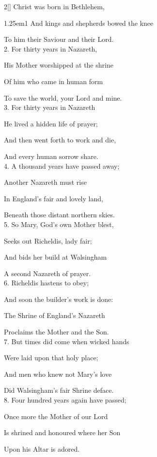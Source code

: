 \begin{paracol}{2}[]
 Christ was born in Bethlehem,\par
{}

\begin{hangparas}{1.25em}{1}
And kings and shepherds bowed the knee\par
To him their Saviour and their Lord.\\

2. For thirty years in Nazareth,\par
His Mother worshipped at the shrine\par
Of him who came in human form\par
To save the world, your Lord and mine.\\

3. For thirty years in Nazareth\par
He lived a hidden life of prayer;\par
And then went forth to work and die,\par
And every human sorrow share.\\

4. A thousand years have passed away;\par
Another Nazareth must rise\par
In England’s fair and lovely land,\par
Beneath those distant northern skies.\\

5. So Mary, God's own Mother blest,\par
Seeks out Richeldis, lady fair;\par
And bids her build at Walsingham\par
A second Nazareth of prayer.\\

6. Richeldis hastens to obey;\par
And soon the builder’s work is done:\par
The Shrine of England’s Nazareth\par
Proclaims the Mother and the Son.\\

7. But times did come when wicked hands\par
Were laid upon that holy place;\par
And men who knew not Mary's love\par
Did Walsingham's fair Shrine deface.\\

8. Four hundred years again have passed;\par
Once more the Mother of our Lord\par
Is shrined and honoured where her Son\par
Upon his Altar is adored.\\


\end{hangparas}
\end{paracol}
